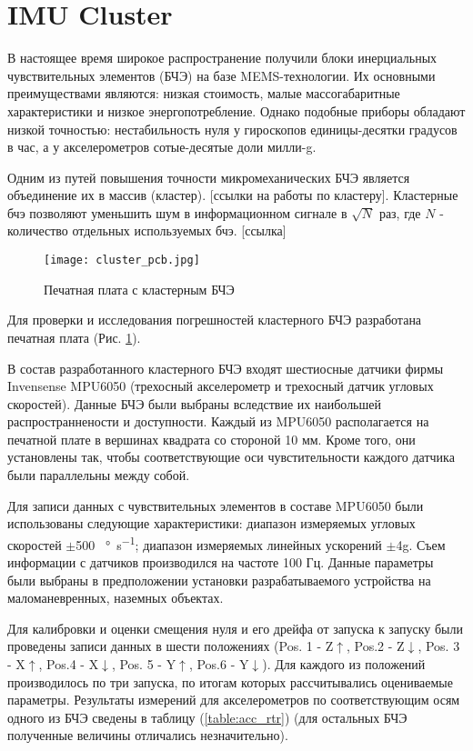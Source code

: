 \section {IMU Cluster}
В настоящее время широкое распространение получили блоки инерциальных чувствительных элементов (БЧЭ) на базе MEMS-технологии.
Их основными преимуществами являются: низкая стоимость, малые массогабаритные характеристики и низкое энергопотребление.
Однако подобные приборы обладают низкой точностью: нестабильность нуля у гироскопов единицы-десятки градусов в час, а у акселерометров сотые-десятые доли милли-g.

Одним из путей повышения точности микромеханических БЧЭ является объединение их в массив (кластер). [ссылки на работы по кластеру].
Кластерные бчэ позволяют уменьшить шум в информационном сигнале в $\sqrt{N}$ раз, где $N$ - количество отдельных используемых бчэ. [ссылка]

\newpage

\begin{figure}[h!]
	\centering
	\texttt{[image: cluster\_pcb.jpg]}
	\caption{Печатная плата с кластерным БЧЭ}
	\label{fig:cluster_pcb}
\end{figure}

Для проверки и исследования погрешностей кластерного БЧЭ разработана печатная плата (Рис. \ref{fig:cluster_pcb}).

В состав разработанного кластерного БЧЭ входят шестиосные датчики фирмы Invensense MPU6050 (трехосный акселерометр и трехосный датчик угловых скоростей).
Данные БЧЭ были выбраны вследствие их наибольшей распространнености и доступности.
Каждый из MPU6050 располагается на печатной плате в вершинах квадрата со стороной 10 мм.
Кроме того, они установлены так, чтобы соответствующие оси чувстительности каждого датчика были параллельны между собой.

Для записи данных с чувствительных элементов в составе MPU6050 были использованы следующие характеристики: диапазон измеряемых угловых скоростей $\pm$500 \SI[per-mode=symbol]{}{\degree\per\second};
диапазон измеряемых линейных ускорений $\pm$4g. Съем информации с датчиков производился на частоте 100 Гц.
Данные параметры были выбраны в предположении установки разрабатываемого устройства на маломаневренных, наземных объектах.

Для калибровки и оценки смещения нуля и его дрейфа от запуска к запуску были проведены записи данных в шести положениях (Pos. 1 - Z$\uparrow$, Pos.2 - Z$\downarrow$,
Pos. 3 - X$\uparrow$, Pos.4 - X$\downarrow$, Pos. 5 - Y$\uparrow$, Pos.6 - Y$\downarrow$). Для каждого из положений производилось по три запуска, по итогам которых рассчитывались
оцениваемые параметры. Результаты измерений для акселерометров по соответствующим осям одного из БЧЭ сведены в таблицу (\ref{table:acc_rtr}) (для остальных БЧЭ полученные величины отличались незначительно).

